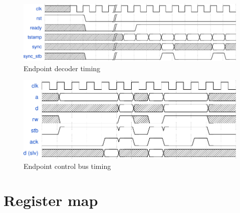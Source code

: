 \documentclass{article}
\begin{document}

\begin{figure}[p]
  \includegraphics[width=1\textwidth]{dts_endpoint_startup_timing.pdf}%
  \caption{Endpoint decoder timing}
  \label{fig:endpoint_startup_timing}
\end{figure}

\begin{figure}[p]
  \includegraphics[width=1\textwidth]{dts_endpoint_ctrl_bus_timing.pdf}%
  \caption{Endpoint control bus timing}
  \label{fig:endpoint_bus_timing}
\end{figure}




\section{Register map}
\label{sect:reg_map}
\end{document}
